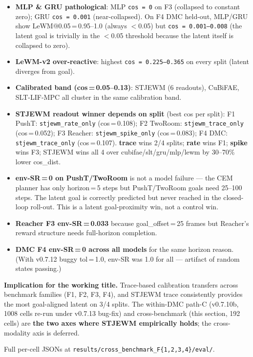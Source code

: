 \documentclass{article}
\begin{document}
\begin{itemize}
\item \textbf{MLP \& GRU pathological}: MLP \texttt{cos\,=\,0} on F3 (collapsed to
constant zero); GRU \texttt{cos\,=\,0.001} (near-collapsed). On F4 DMC
held-out, MLP/GRU show LeWM@0.05\,=\,0.95--1.0 (always $<$0.05) but
\texttt{cos\,=\,0.001--0.008} (the latent goal is trivially in the $<$0.05
threshold because the latent itself is collapsed to zero).
\item \textbf{LeWM-v2 over-reactive}: highest \texttt{cos\,=\,0.225--0.365} on every
split (latent diverges from goal).
\item \textbf{Calibrated band (cos\,=\,0.05--0.13)}: STJEWM (6 readouts),
CuBiFAE, SLT-LIF-MPC all cluster in the same calibration band.
\item \textbf{STJEWM readout winner depends on split} (best cos per split):
F1 PushT: \texttt{stjewm\_rate\_only} (cos\,=\,0.108);
F2 TwoRoom: \texttt{stjewm\_trace\_only} (cos\,=\,0.052);
F3 Reacher: \texttt{stjewm\_spike\_only} (cos\,=\,0.083);
F4 DMC: \texttt{stjewm\_trace\_only} (cos\,=\,0.107).
\textbf{trace} wins 2/4 splits; \textbf{rate} wins F1; \textbf{spike} wins F3; STJEWM wins all 4
over cubifae/slt/gru/mlp/lewm by 30--70\% lower cos\_dist.
\item \textbf{env-SR\,=\,0 on PushT/TwoRoom} is not a model failure --- the CEM
planner has only horizon\,=\,5 steps but PushT/TwoRoom goals need
25--100 steps. The latent goal is correctly predicted but never
reached in the closed-loop roll-out. This is a latent goal-proximity
win, not a control win.
\item \textbf{Reacher F3 env-SR\,=\,0.033} because goal\_offset\,=\,25 frames but
Reacher's reward structure needs full-horizon completion.
\item \textbf{DMC F4 env-SR\,=\,0 across all models} for the same horizon
reason. (With v0.7.12 buggy tol\,=\,1.0, env-SR was 1.0 for all ---
artifact of random states passing.)
\end{itemize}

\textbf{Implication for the working title.} Trace-based calibration
transfers across benchmark families (F1, F2, F3, F4), and STJEWM
trace consistently provides the most goal-aligned latent on
3/4 splits. The within-DMC path-C (v0.7.10b, 1008 cells re-run under
v0.7.13 bug-fix) and cross-benchmark (this section, 192 cells) are
\textbf{the two axes where STJEWM empirically holds}; the cross-modality
axis is deferred.

Full per-cell JSONs at \texttt{results/cross\_benchmark\_F\{1,2,3,4\}/eval/}.
\end{document}
